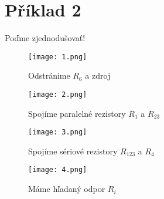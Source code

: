\section{Příklad 2}
\graphicspath{{fig/pr2/}}
\setcounter{figure}{0}

\bigskip


\centerline{\Large{Poďme zjednodušovať!}}
\begin{figure}[H]
\centering
\texttt{[image: 1.png]}
\caption{Odstránime $ R_6 $ a zdroj}
\end{figure}
\begin{figure}[H]
\centering
\texttt{[image: 2.png]}
\caption{Spojíme paralelné rezistory $R_1$ a $R_{23}$}
\end{figure}
\begin{figure}[H]
\centering
\texttt{[image: 3.png]}
\caption{Spojíme sériové rezistory $R_{123}$ a $R_4$}
\end{figure}\begin{figure}[H]
\centering
\texttt{[image: 4.png]}
\caption{Máme hľadaný odpor $R_i$}
\end{figure}


